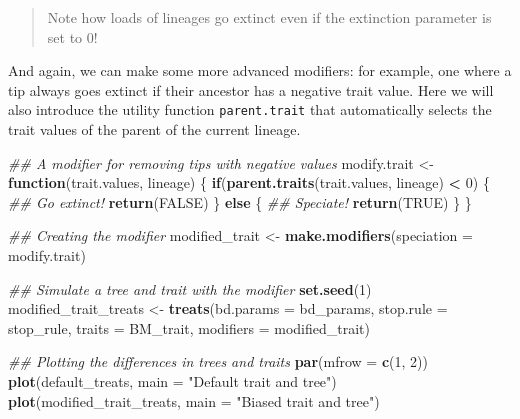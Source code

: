 \documentclass[
]{book}
\newenvironment{Shaded}{\begin{snugshade}}{\end{snugshade}}
\newcommand{\CommentTok}[1]{\textcolor[rgb]{0.56,0.35,0.01}{\textit{#1}}}
\newcommand{\ControlFlowTok}[1]{\textcolor[rgb]{0.13,0.29,0.53}{\textbf{#1}}}
\newcommand{\DataTypeTok}[1]{\textcolor[rgb]{0.13,0.29,0.53}{#1}}
\newcommand{\DecValTok}[1]{\textcolor[rgb]{0.00,0.00,0.81}{#1}}
\newcommand{\KeywordTok}[1]{\textcolor[rgb]{0.13,0.29,0.53}{\textbf{#1}}}
\newcommand{\NormalTok}[1]{#1}
\newcommand{\OperatorTok}[1]{\textcolor[rgb]{0.81,0.36,0.00}{\textbf{#1}}}
\newcommand{\OtherTok}[1]{\textcolor[rgb]{0.56,0.35,0.01}{#1}}
\newcommand{\StringTok}[1]{\textcolor[rgb]{0.31,0.60,0.02}{#1}}
\begin{document}
\begin{quote}
Note how loads of lineages go extinct even if the extinction parameter is set to 0!
\end{quote}

And again, we can make some more advanced modifiers: for example, one where a tip always goes extinct if their ancestor has a negative trait value. Here we will also introduce the utility function \texttt{parent.trait} that automatically selects the trait values of the parent of the current lineage.

\begin{Shaded}
\begin{Highlighting}[]
\CommentTok{\#\# A modifier for removing tips with negative values}
\NormalTok{modify.trait \textless{}{-}}\StringTok{ }\ControlFlowTok{function}\NormalTok{(trait.values, lineage) \{}
    \ControlFlowTok{if}\NormalTok{(}\KeywordTok{parent.traits}\NormalTok{(trait.values, lineage) }\OperatorTok{\textless{}}\StringTok{ }\DecValTok{0}\NormalTok{) \{}
        \CommentTok{\#\# Go extinct!}
        \KeywordTok{return}\NormalTok{(}\OtherTok{FALSE}\NormalTok{)}
\NormalTok{    \} }\ControlFlowTok{else}\NormalTok{ \{}
        \CommentTok{\#\# Speciate!}
        \KeywordTok{return}\NormalTok{(}\OtherTok{TRUE}\NormalTok{)}
\NormalTok{    \}}
\NormalTok{\}}

\CommentTok{\#\# Creating the modifier}
\NormalTok{modified\_trait \textless{}{-}}\StringTok{ }\KeywordTok{make.modifiers}\NormalTok{(}\DataTypeTok{speciation =}\NormalTok{ modify.trait)}

\CommentTok{\#\# Simulate a tree and trait with the modifier}
\KeywordTok{set.seed}\NormalTok{(}\DecValTok{1}\NormalTok{)}
\NormalTok{modified\_trait\_treats \textless{}{-}}\StringTok{ }\KeywordTok{treats}\NormalTok{(}\DataTypeTok{bd.params =}\NormalTok{ bd\_params,}
                          \DataTypeTok{stop.rule =}\NormalTok{ stop\_rule,}
                          \DataTypeTok{traits    =}\NormalTok{ BM\_trait,}
                          \DataTypeTok{modifiers =}\NormalTok{ modified\_trait)}

\CommentTok{\#\# Plotting the differences in trees and traits}
\KeywordTok{par}\NormalTok{(}\DataTypeTok{mfrow =} \KeywordTok{c}\NormalTok{(}\DecValTok{1}\NormalTok{, }\DecValTok{2}\NormalTok{))}
\KeywordTok{plot}\NormalTok{(default\_treats, }\DataTypeTok{main =} \StringTok{"Default trait and tree"}\NormalTok{)}
\KeywordTok{plot}\NormalTok{(modified\_trait\_treats, }\DataTypeTok{main =} \StringTok{"Biased trait and tree"}\NormalTok{)}
\end{Highlighting}
\end{Shaded}
\end{document}
